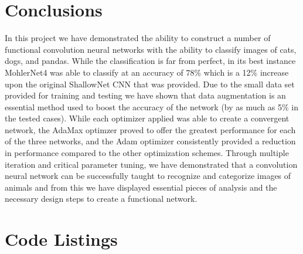 \documentclass[12pt]{article}
\begin{document}
\section{Conclusions}
In this project we have demonstrated the ability to construct a number of functional convolution neural networks with the ability to classify images of cats, dogs, and pandas. While the classification is far from perfect, in its best instance MohlerNet4 was able to classify at an accuracy of $78\%$ which is a 12\% increase upon the original ShallowNet CNN that was provided. Due to the small data set provided for training and testing we have shown that data augmentation is an essential method used to boost the accuracy of the network (by as much as 5\% in the tested cases). While each optimizer applied was able to create a convergent network, the AdaMax optimzer proved to offer the greatest performance for each of the three networks, and the Adam optimizer consistently provided a reduction in performance compared to the other optimization schemes. Through multiple iteration and critical parameter tuning, we have demonstrated that a convolution neural network can be successfully taught to recognize and categorize images of animals and from this we have displayed essential pieces of analysis and the necessary design steps to create a functional network.  
\newpage
\appendix %



\section{Code Listings}\label{code}



% 
%



\newpage  %


\end{document}
